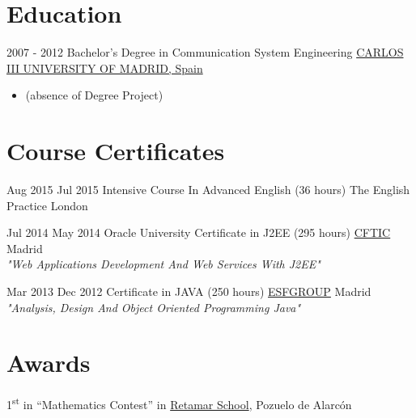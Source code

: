 \documentclass[letterpaper]{twentysecondcv} %
\begin{document}
\section{Education}

\begin{twenty} %
	\twentyitem
    	{2007 - 2012}
        {}
        {Bachelor's Degree in Communication System Engineering}
        \newline
       {\href{https://www.uc3m.es/Home}{CARLOS III UNIVERSITY OF MADRID, Spain}}
       {\begin{itemize}
       \item (absence of Degree Project)
       \end{itemize}}
        {}
        {}
\end{twenty}

\section{Course Certificates}
\begin{twenty}
	\twentyitem
    	{Aug 2015}
		{Jul 2015}
        {Intensive Course In Advanced English (36 hours)}
        {The English Practice}
        {}
        {London}
\end{twenty}

\begin{twenty}
	\twentyitem
    	{Jul 2014}
		{May 2014}
        {Oracle University Certificate in J2EE (295 hours)}
        {\href{https://cftic.centrosdeformacion.empleo.madrid.org/}{CFTIC}}
        {}
        {Madrid\\
        \textit{"Web Applications Development And Web Services With J2EE"}}      
\end{twenty}

\begin{twenty}
	\twentyitem
    	{Mar 2013}
		{Dec 2012}
        {Certificate in JAVA (250 hours)}
        {\href{http://www.esf.es/}{ESFGROUP}}
        {}
        {Madrid\\
        \textit{"Analysis, Design And Object Oriented Programming Java"}}      
\end{twenty}

\section{Awards}

1\textsuperscript{st} in “Mathematics Contest” in \href{http://retamar.com/}{Retamar School}, Pozuelo de Alarcón
\end{document}
